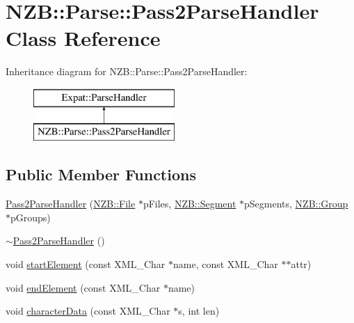 \hypertarget{class_n_z_b_1_1_parse_1_1_pass2_parse_handler}{}\section{N\+ZB\+:\+:Parse\+:\+:Pass2\+Parse\+Handler Class Reference}
\label{class_n_z_b_1_1_parse_1_1_pass2_parse_handler}
Inheritance diagram for N\+ZB\+:\+:Parse\+:\+:Pass2\+Parse\+Handler\+:\begin{figure}[H]
\begin{center}
\leavevmode
\includegraphics[height=2.000000cm]{class_n_z_b_1_1_parse_1_1_pass2_parse_handler}
\end{center}
\end{figure}
\subsection*{Public Member Functions}
\begin{DoxyCompactItemize}
\item 
\hyperlink{class_n_z_b_1_1_parse_1_1_pass2_parse_handler_a04b11c88f54b2804e13043c5cd57e0d7}{Pass2\+Parse\+Handler} (\hyperlink{class_n_z_b_1_1_file}{N\+Z\+B\+::\+File} $\ast$p\+Files, \hyperlink{class_n_z_b_1_1_segment}{N\+Z\+B\+::\+Segment} $\ast$p\+Segments, \hyperlink{class_n_z_b_1_1_group}{N\+Z\+B\+::\+Group} $\ast$p\+Groups)
\item 
\hyperlink{class_n_z_b_1_1_parse_1_1_pass2_parse_handler_aeda10efa356a2b6ef318a37684206f6c}{$\sim$\+Pass2\+Parse\+Handler} ()
\item 
void \hyperlink{class_n_z_b_1_1_parse_1_1_pass2_parse_handler_a2b3ab039352b1bf106d795188d0cd4c1}{start\+Element} (const X\+M\+L\+\_\+\+Char $\ast$name, const X\+M\+L\+\_\+\+Char $\ast$$\ast$attr)
\item 
void \hyperlink{class_n_z_b_1_1_parse_1_1_pass2_parse_handler_aadec64ab8a4f9bfd7f3b40bd76cce7aa}{end\+Element} (const X\+M\+L\+\_\+\+Char $\ast$name)
\item 
void \hyperlink{class_n_z_b_1_1_parse_1_1_pass2_parse_handler_adafb3081bcec7653a9b0b3ce8f25a1a5}{character\+Data} (const X\+M\+L\+\_\+\+Char $\ast$s, int len)
\end{DoxyCompactItemize}
